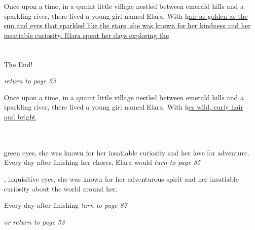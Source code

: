 \documentclass{memoir}
\begin{document}
        \hspace{1cm}\vfill
        \begin{minipage}{3in}
        \LARGE
        Once upon a time, in a quaint little village nestled between emerald hills and a sparkling river, there lived a young girl named Elara. With h\ul{air as golden as the sun and eyes that sparkled like the stars, she was known for her kindness and her insatiable curiosity. Elara spent her days exploring the}\\ \vspace{5mm} \\
 \\\vspace{1cm} The End! \\ 

        \hspace{1cm}\begin{minipage}{6cm}
        \normalsize
            \hfill \textit{return to page 53}
        \end{minipage} 
        \end{minipage}
        \hspace{1cm}\vfill
        \cleardoublepage

        


        \hspace{1cm}\vfill
        \begin{minipage}{3in}
        \LARGE
        Once upon a time, in a quaint little village nestled between emerald hills and a sparkling river, there lived a young girl named Elara. With h\ul{er wild, curly hair and bright}\\ \vspace{5mm} \\
  \\ 

        \hspace{1cm}\begin{minipage}{6cm}
        \normalsize
             green eyes, she was known for her insatiable curiosity and her love for adventure. Every day after finishing her chores, Elara would \hfill \textit{turn to page 85}\\ \vspace{5mm}

, inquisitive eyes, she was known for her adventurous spirit and her insatiable curiosity about the world around her.

Every day after finishing \hfill \textit{turn to page 87}\\ \vspace{5mm}

\hfill \textit{or return to page 53}
        \end{minipage} 
        \end{minipage}
        \hspace{1cm}\vfill
        \cleardoublepage
\end{document}
